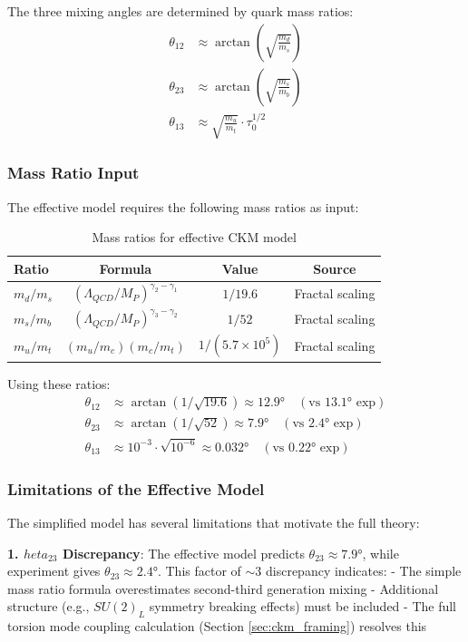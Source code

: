 The three mixing angles are determined by quark mass ratios:
\begin{align}
    \theta_{12} &\approx \arctan\left(\sqrt{\frac{m_d}{m_s}}\right) \\
    \theta_{23} &\approx \arctan\left(\sqrt{\frac{m_s}{m_b}}\right) \\
    \theta_{13} &\approx \sqrt{\frac{m_u}{m_t}} \cdot \tau_0^{1/2}
\end{align}

\subsubsection{Mass Ratio Input}

The effective model requires the following mass ratios as input:

\begin{table}[h]
\centering
\begin{tabular}{lccc}
\toprule
\textbf{Ratio} & \textbf{Formula} & \textbf{Value} & \textbf{Source} \\
\midrule
$m_d/m_s$ & $(\Lambda_{QCD}/M_P)^{\gamma_2-\gamma_1}$ & $1/19.6$ & Fractal scaling \\
$m_s/m_b$ & $(\Lambda_{QCD}/M_P)^{\gamma_3-\gamma_2}$ & $1/52$ & Fractal scaling \\
$m_u/m_t$ & $(m_u/m_c)(m_c/m_t)$ & $1/(5.7\times 10^5)$ & Fractal scaling \\
\bottomrule
\end{tabular}
\caption{Mass ratios for effective CKM model}
\end{table}

Using these ratios:
\begin{align}
    \theta_{12} &\approx \arctan(1/\sqrt{19.6}) \approx 12.9° \quad (\text{vs } 13.1° \text{ exp}) \\
    \theta_{23} &\approx \arctan(1/\sqrt{52}) \approx 7.9° \quad (\text{vs } 2.4° \text{ exp}) \\
    \theta_{13} &\approx 10^{-3} \cdot \sqrt{10^{-6}} \approx 0.032° \quad (\text{vs } 0.22° \text{ exp})
\end{align}

\subsubsection{Limitations of the Effective Model}

The simplified model has several limitations that motivate the full theory:

\textbf{1. $	heta_{23}$ Discrepancy}: The effective model predicts $\theta_{23} \approx 7.9°$, while experiment gives $\theta_{23} \approx 2.4°$. This factor of $\sim 3$ discrepancy indicates:
- The simple mass ratio formula overestimates second-third generation mixing
- Additional structure (e.g., $SU(2)_L$ symmetry breaking effects) must be included
- The full torsion mode coupling calculation (Section \ref{sec:ckm_framing}) resolves this

